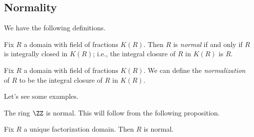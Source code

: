 \subsection{Normality}
We have the following definitions.
\begin{definition}[Normal]
	Fix $R$ a domain with field of fractions $K(R)$. Then $R$ is \textit{normal} if and only if $R$ is integrally closed in $K(R)$; i.e., the integral closure of $R$ in $K(R)$ is $R$.
\end{definition}
\begin{definition}[Normalization]
	Fix $R$ a domain with field of fractions $K(R)$. We can define the \textit{normalization} of $R$ to be the integral closure of $R$ in $K(R)$.
\end{definition}
Let's see some examples.
\begin{example}
	The ring $\ZZ$ is normal. This will follow from the following proposition.
\end{example}
\begin{proposition} \label{prop:ufdnormal}
	Fix $R$ a unique factorization domain. Then $R$ is normal.
\end{proposition}
